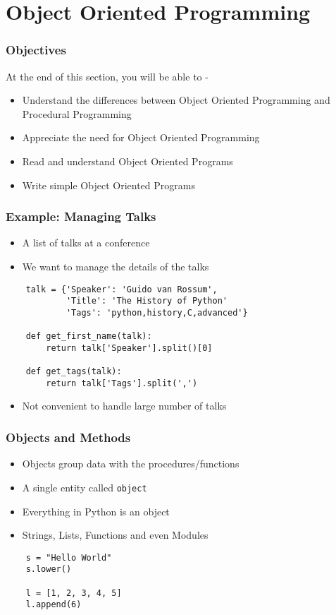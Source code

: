 \section{Object Oriented Programming}

\begin{frame}[fragile]
  \frametitle{Objectives}
  At the end of this section, you will be able to -
  \begin{itemize}
  \item Understand the differences between Object Oriented Programming
    and Procedural Programming
  \item Appreciate the need for Object Oriented Programming
  \item Read and understand Object Oriented Programs
  \item Write simple Object Oriented Programs
  \end{itemize}
\end{frame}

\begin{frame}[fragile]
  \frametitle{Example: Managing Talks}
  \begin{itemize}
  \item A list of talks at a conference
  \item We want to manage the details of the talks
  \end{itemize}
  \begin{lstlisting}
    talk = {'Speaker': 'Guido van Rossum', 
            'Title': 'The History of Python'
            'Tags': 'python,history,C,advanced'} 

    def get_first_name(talk):
        return talk['Speaker'].split()[0]

    def get_tags(talk):
        return talk['Tags'].split(',')
  \end{lstlisting}
  \begin{itemize}
  \item Not convenient to handle large number of talks
  \end{itemize}
\end{frame}

\begin{frame}[fragile]
  \frametitle{Objects and Methods}
  \begin{itemize}
  \item Objects group data with the procedures/functions
  \item A single entity called \texttt{object}
  \item Everything in Python is an object
  \item Strings, Lists, Functions and even Modules
  \end{itemize}
  \begin{lstlisting}
    s = "Hello World"
    s.lower()

    l = [1, 2, 3, 4, 5]
    l.append(6)
  \end{lstlisting}
\end{frame}


